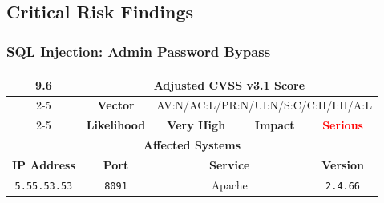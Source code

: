 \documentclass[12pt, letterpaper]{article}
\begin{document}
\bigskip
\begin{table}[!ht]
  \centering
  \caption{Additional factors that determine adjusted CVSS score.}
  \label{other-factors}
\end{table}
\FloatBarrier
\bigskip

\clearpage
\subsection{Critical Risk Findings}
\bigskip

\subsubsection{SQL Injection: Admin Password Bypass}

\begin{table}[!ht]
  \centering
  \renewcommand{\arraystretch}{1.8} %
  \begin{tabular}{|c|c|c|c|c|}
    \hline
    \multirow{3}{*}{\textcolor{RoyalPurple}{\textbf{\huge 9.6}}} &
    \multicolumn{4}{c|}{\textbf{Adjusted CVSS v3.1 Score}} \\ \cline{2-5}
    & \textbf{Vector} &
    \multicolumn{3}{c|}{AV:N/AC:L/PR:N/UI:N/S:C/C:H/I:H/A:L} \\ \cline{2-5}
    & \textbf{Likelihood} & \textcolor{RoyalPurple}{\textbf{Very High}}
    & \textbf{Impact} & \textcolor{red}{\textbf{Serious}} \\ \hline
    \multicolumn{5}{|c|}{\textbf{Affected Systems}} \\ \hline
    \textbf{IP Address} & \textbf{Port} &
    \multicolumn{2}{c|}{\textbf{Service}} & \textbf{Version} \\ \hline
    \texttt{5.55.53.53} & \texttt{8091} & \multicolumn{2}{c|}{Apache}
    & \texttt{2.4.66} \\ \hline
  \end{tabular}
\end{table}
\FloatBarrier
\end{document}
